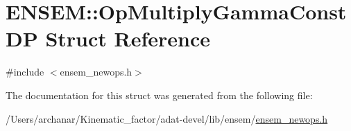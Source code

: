 \hypertarget{structENSEM_1_1OpMultiplyGammaConstDP}{}\section{E\+N\+S\+EM\+:\+:Op\+Multiply\+Gamma\+Const\+DP Struct Reference}
\label{structENSEM_1_1OpMultiplyGammaConstDP}


{\ttfamily \#include $<$ensem\+\_\+newops.\+h$>$}



The documentation for this struct was generated from the following file\+:\begin{DoxyCompactItemize}
\item 
/\+Users/archanar/\+Kinematic\+\_\+factor/adat-\/devel/lib/ensem/\mbox{\hyperlink{adat-devel_2lib_2ensem_2ensem__newops_8h}{ensem\+\_\+newops.\+h}}\end{DoxyCompactItemize}
